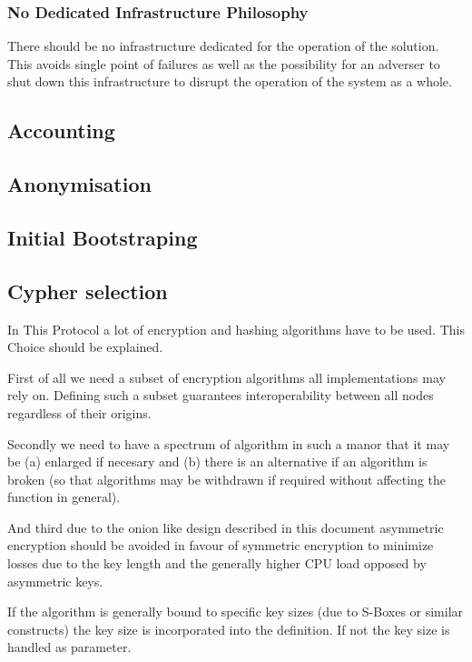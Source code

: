 \subsubsection{No Dedicated Infrastructure Philosophy}
There should be no infrastructure dedicated for the operation of the solution. This avoids single point of failures as well as the possibility for an adverser to shut down this infrastructure to disrupt the operation of the system as a whole.

\subsection{Accounting}

\subsection{Anonymisation}

\subsection{Initial Bootstraping}

\subsection{Cypher selection}
In This Protocol a lot of encryption and hashing algorithms have to be used. This Choice should be explained. 

First of all we need a subset of encryption algorithms all implementations may rely on. Defining such a subset guarantees interoperability between all nodes regardless of their origins. 

Secondly we need to have a spectrum of algorithm in such a manor that it may be (a) enlarged if necesary and (b) there is an alternative if an algorithm is broken (so that algorithms may be withdrawn if required without affecting the function in general). 

And third due to the onion like design described in this document asymmetric encryption should be avoided in favour of symmetric encryption to minimize losses due to the key length and the generally higher CPU load opposed by asymmetric keys.

If the algorithm is generally bound to specific key sizes (due to S-Boxes or similar constructs) the key size is incorporated into the definition. If not the key size is handled as parameter.

